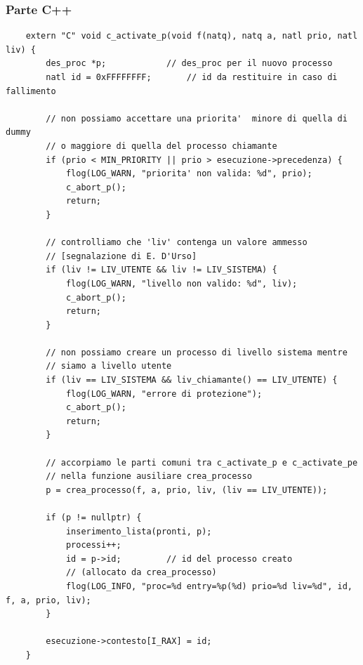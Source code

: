 \subsubsection{Parte C++}
\small 
\begin{verbatim}
	extern "C" void c_activate_p(void f(natq), natq a, natl prio, natl liv) {
		des_proc *p;			// des_proc per il nuovo processo
		natl id = 0xFFFFFFFF;		// id da restituire in caso di fallimento
		
		// non possiamo accettare una priorita'  minore di quella di dummy
		// o maggiore di quella del processo chiamante
		if (prio < MIN_PRIORITY || prio > esecuzione->precedenza) {
			flog(LOG_WARN, "priorita' non valida: %d", prio);
			c_abort_p();
			return;
		}
		
		// controlliamo che 'liv' contenga un valore ammesso
		// [segnalazione di E. D'Urso]
		if (liv != LIV_UTENTE && liv != LIV_SISTEMA) {
			flog(LOG_WARN, "livello non valido: %d", liv);
			c_abort_p();
			return;
		}
		
		// non possiamo creare un processo di livello sistema mentre
		// siamo a livello utente
		if (liv == LIV_SISTEMA && liv_chiamante() == LIV_UTENTE) {
			flog(LOG_WARN, "errore di protezione");
			c_abort_p();
			return;
		}
		
		// accorpiamo le parti comuni tra c_activate_p e c_activate_pe
		// nella funzione ausiliare crea_processo
		p = crea_processo(f, a, prio, liv, (liv == LIV_UTENTE));
		
		if (p != nullptr) {
			inserimento_lista(pronti, p);
			processi++;
			id = p->id;			// id del processo creato
			// (allocato da crea_processo)
			flog(LOG_INFO, "proc=%d entry=%p(%d) prio=%d liv=%d", id, f, a, prio, liv);
		}
		
		esecuzione->contesto[I_RAX] = id;
	}
\end{verbatim}
\normalsize 
